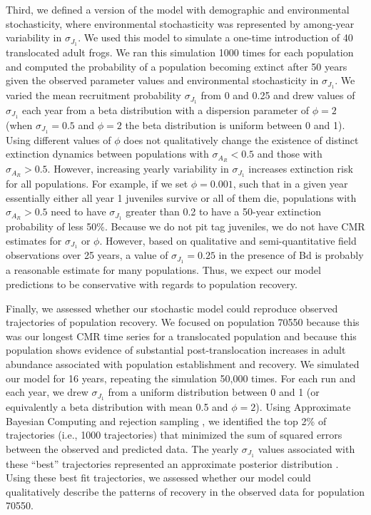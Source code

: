 \documentclass[9pt,twoside,lineno]{pnas-new}
\begin{document}
Third, we defined a version of the model with demographic and
environmental stochasticity, where environmental stochasticity was
represented by among-year variability in \(\sigma_{J_1}\). We used this
model to simulate a one-time introduction of 40 translocated adult
frogs. We ran this simulation 1000 times for each population and
computed the probability of a population becoming extinct after 50 years
given the observed parameter values and environmental stochasticity in
\(\sigma_{J_1}\). We varied the mean recruitment probability
\(\sigma_{J_1}\) from 0 and 0.25 and drew values of \(\sigma_{J_1}\)
each year from a beta distribution with a dispersion parameter of
\(\phi = 2\) (when \(\sigma_{J_1} = 0.5\) and \(\phi = 2\) the beta
distribution is uniform between 0 and 1). Using different values of
\(\phi\) does not qualitatively change the existence of distinct
extinction dynamics between populations with \(\sigma_{A_R} < 0.5\) and
those with \(\sigma_{A_R} > 0.5\). However, increasing yearly
variability in \(\sigma_{J_1}\) increases extinction risk for all
populations. For example, if we set \(\phi = 0.001\), such that in a
given year essentially either all year 1 juveniles survive or all of
them die, populations with \(\sigma_{A_R} > 0.5\) need to have
\(\sigma_{J_1}\) greater than 0.2 to have a 50-year extinction
probability of less 50\%. Because we do not pit tag juveniles, we do not
have CMR estimates for \(\sigma_{J_1}\) or \(\phi\). However, based on
qualitative and semi-quantitative field observations over 25 years, a
value of \(\sigma_{J_1} = 0.25\) in the presence of Bd is probably a
reasonable estimate for many populations. Thus, we expect our model
predictions to be conservative with regards to population recovery.

Finally, we assessed whether our stochastic model could reproduce
observed trajectories of population recovery. We focused on population
70550 because this was our longest CMR time series for a translocated
population and because this population shows evidence of substantial
post-translocation increases in adult abundance associated with
population establishment and recovery. We simulated our model for 16
years, repeating the simulation 50,000 times. For each run and each
year, we drew \(\sigma_{J_1}\) from a uniform distribution between 0 and
1 (or equivalently a beta distribution with mean 0.5 and \(\phi = 2\)).
Using Approximate Bayesian Computing and rejection sampling
\citep{kosmala2016}, we identified the top 2\% of trajectories (i.e.,
1000 trajectories) that minimized the sum of squared errors between the
observed and predicted data. The yearly \(\sigma_{J_1}\) values
associated with these ``best'' trajectories represented an approximate
posterior distribution \citep{beaumont2010}. Using these best fit
trajectories, we assessed whether our model could qualitatively describe
the patterns of recovery in the observed data for population 70550.
\end{document}
